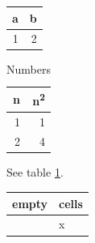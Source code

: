 \documentclass[11pt]{article}
\date{\today}
\title{}
\begin{document}
\tableofcontents

\begin{center}
\begin{tabular}{|rr|}
a & b\\
\hline
1 & 2\\
\end{tabular}
\end{center}

\begin{table}[htbp]
\caption{\label{tab:org7bfd295}Numbers}
\centering
\begin{tabular}{rr}
n & n\textsuperscript{2}\\
\hline
1 & 1\\
2 & 4\\
\end{tabular}
\end{table}

See table \ref{tab:org7bfd295}.

\begin{center}
\begin{tabular}{ll}
empty & cells\\
\hline
 & x\\
\end{tabular}
\end{center}
\end{document}
